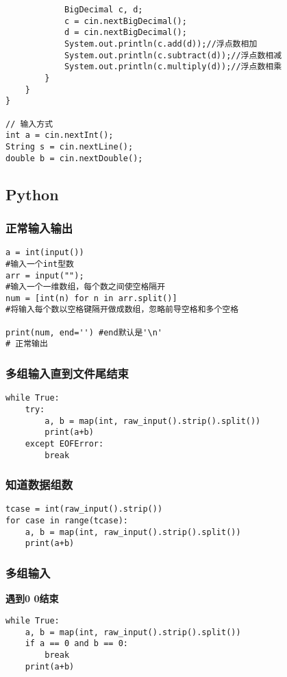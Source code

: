 \begin{lstlisting}
			BigDecimal c, d;
			c = cin.nextBigDecimal();
			d = cin.nextBigDecimal();
			System.out.println(c.add(d));//浮点数相加
			System.out.println(c.subtract(d));//浮点数相减
			System.out.println(c.multiply(d));//浮点数相乘
		}
	}
}

// 输入方式
int a = cin.nextInt();
String s = cin.nextLine();
double b = cin.nextDouble();
\end{lstlisting}


\subsection{Python}
\subsubsection{正常输入输出}
\begin{lstlisting}
a = int(input())
#输入一个int型数
arr = input("");    
#输入一个一维数组，每个数之间使空格隔开
num = [int(n) for n in arr.split()] 
#将输入每个数以空格键隔开做成数组，忽略前导空格和多个空格

print(num, end='') #end默认是'\n'
# 正常输出
\end{lstlisting}

\subsubsection{多组输入直到文件尾结束}
\begin{lstlisting}
while True:
	try:
		a, b = map(int, raw_input().strip().split())
		print(a+b)
	except EOFError:
		break
\end{lstlisting}

\subsubsection{知道数据组数}
\begin{lstlisting}
tcase = int(raw_input().strip())
for case in range(tcase):
	a, b = map(int, raw_input().strip().split())
	print(a+b)
\end{lstlisting}

\subsubsection{多组输入}
\textbf{遇到0 0结束}\\
\begin{lstlisting}
while True:
	a, b = map(int, raw_input().strip().split())
	if a == 0 and b == 0:
		break
	print(a+b)
\end{lstlisting}

